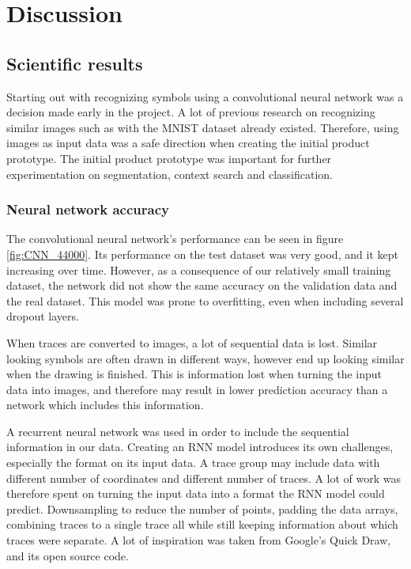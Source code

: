 \chapter{Discussion}

\section{Scientific results}

Starting out with recognizing symbols using a convolutional neural network was a decision made early in the project. A lot of previous research on recognizing similar images such as with the MNIST dataset already existed. Therefore, using images as input data was a safe direction when creating the initial product prototype. The initial product prototype was important for further experimentation on segmentation, context search and classification. %

\subsection{Neural network accuracy}
The convolutional neural network's performance can be seen in figure \ref{fig:CNN_44000}. Its performance on the test dataset was very good, and it kept increasing over time. However, as a consequence of our relatively small training dataset, the network did not show the same accuracy on the validation data and the real dataset. This model was prone to overfitting, even when including several dropout layers. 

When traces are converted to images, a lot of sequential data is lost. Similar looking symbols are often drawn in different ways, however end up looking similar when the drawing is finished. This is information lost when turning the input data into images, and therefore may result in lower prediction accuracy than a network which includes this information.

A recurrent neural network was used in order to include the sequential information in our data. Creating an RNN model introduces its own challenges, especially the format on its input data. A trace group may include data with different number of coordinates and different number of traces. A lot of work was therefore spent on turning the input data into a format the RNN model could predict. Downsampling to reduce the number of points, padding the data arrays, combining traces to a single trace all while still keeping information about which traces were separate. A lot of inspiration was taken from Google's Quick Draw, and its open source code. \cite{_recurrent_2017} 

